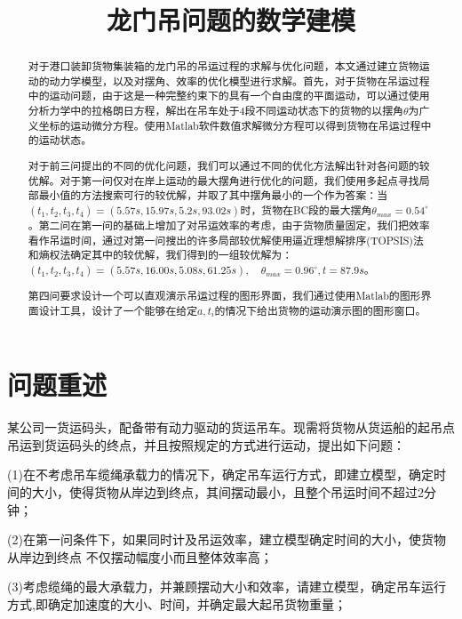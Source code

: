 \documentclass[withoutpreface,bwprint]{cumcmthesis} %
\title{龙门吊问题的数学建模}
\begin{document}
\maketitle
\begin{abstract}
    对于港口装卸货物集装箱的龙门吊的吊运过程的求解与优化问题，本文通过建立货物运动的动力学模型，以及对摆角、效率的优化模型进行求解。首先，对于货物在吊运过程中的运动问题，由于这是一种完整约束下的具有一个自由度的平面运动，可以通过使用分析力学中的拉格朗日方程，解出在吊车处于4段不同运动状态下的货物的以摆角$\theta$为广义坐标的运动微分方程。使用Matlab软件数值求解微分方程可以得到货物在吊运过程中的运动状态。

    对于前三问提出的不同的优化问题，我们可以通过不同的优化方法解出针对各问题的较优解。对于第一问仅对在岸上运动的最大摆角进行优化的问题，我们使用多起点寻找局部最小值的方法搜索可行的较优解，并取了其中摆角最小的一个作为答案：当$(t_1,t_2,t_3,t_4)=(5.57s,15.97s,5.2s,93.02s)$时，货物在BC段的最大摆角$\theta_{max}=0.54^{\circ}$。第二问在第一问的基础上增加了对吊运效率的考虑，由于货物质量固定，我们把效率看作吊运时间，通过对第一问搜出的许多局部较优解使用逼近理想解排序(TOPSIS)法和熵权法确定其中的较优解，我们得到的一组较优解为：$(t_1,t_2,t_3,t_4)=(5.57s,16.00s,5.08s,61.25s),\quad \theta_{max}=0.96^{\circ},t=87.9s$。

    第四问要求设计一个可以直观演示吊运过程的图形界面，我们通过使用Matlab的图形界面设计工具，设计了一个能够在给定$a,t_i$的情况下给出货物的运动演示图的图形窗口。

\end{abstract}
\section{问题重述}
某公司一货运码头，配备带有动力驱动的货运吊车。现需将货物从货运船的起吊点吊运到货运码头的终点，并且按照规定的方式进行运动，提出如下问题：

(1)在不考虑吊车缆绳承载力的情况下，确定吊车运行方式，即建立模型，确定时间的大小，使得货物从岸边到终点，其间摆动最小，且整个吊运时间不超过2分钟；

(2)在第一问条件下，如果同时计及吊运效率，建立模型确定时间的大小，使货物从岸边到终点 不仅摆动幅度小而且整体效率高；

(3)考虑缆绳的最大承载力，并兼顾摆动大小和效率，请建立模型，确定吊车运行方式,即确定加速度的大小、时间，并确定最大起吊货物重量；
\end{document}
